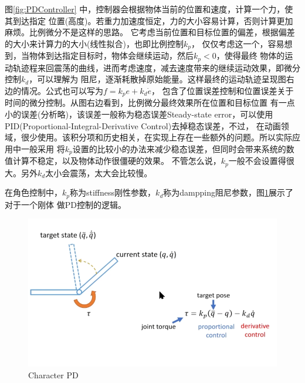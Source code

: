 \documentclass[lang=cn,newtx,10pt,scheme=chinese]{elegantbook}
\begin{document}
图\ref{fig:PDController} 中，控制器会根据物体当前的位置和速度，计算一个力，使其到达指定
位置(高度)。若重力加速度恒定，力的大小容易计算，否则计算更加麻烦。比例微分不是这样的思路。
它考虑当前位置和目标位置的偏差，根据偏差的大小来计算力的大小(线性拟合)，也即比例控制$k_p$，
仅仅考虑这一个，容易想到，当物体到达指定目标时，物体会继续运动，然后$k_p<0$，使得最终
物体的运动轨迹程来回震荡的曲线，进而考虑速度，减去速度带来的继续运动效果，即微分控制$k_d$，可以理解为
阻尼，逐渐耗散掉原始能量。这样最终的运动轨迹呈现图右边的情况。公式也可以写为$f=k_p e + k_d \dot{e}$，
包含了位置误差控制和位置误差关于时间的微分控制。从图右边看到，比例微分最终效果所在位置和目标位置
有一点小的误差(分析略)，该误差一般称为稳态误差Steady-state error，可以使用PID(Proportional-Integral-Derivative Control)去掉稳态误差，不过，
在动画领域，很少使用。该积分项和历史相关，在实现上存在一些额外的问题。所以实际应用中一般采用
将$k_p$设置的比较小的办法来减少稳态误差，但同时会带来系统的数值计算不稳定，以及物体动作很僵硬的效果。
不管怎么说，$k_p$一般不会设置得很大。另外$k_d$太小会震荡，太大会比较慢。

在角色控制中，$k_p$称为stiffness刚性参数，$k_d$称为dampping阻尼参数，图\ref{fig:CharacterPD}展示了对于一个刚体
做PD控制的逻辑。
\begin{figure}[htbp]
  \centering
  \includegraphics[totalheight=1.5in]{"./image/CharacterPD.png"}
  \caption{Character PD} \label{fig:CharacterPD}
\end{figure}
\end{document}
